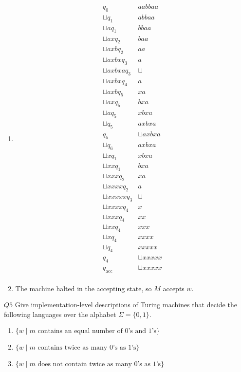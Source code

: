 \documentclass{article}
\theoremstyle{definition}
\theoremstyle{definition}
\theoremstyle{remark}
\begin{document}
\begin{enumerate}
    \item[$(iii)$]
    \begin{align*}
        q_0&aabbaa\\
        {\sqcup}q_1&abbaa\\
        {\sqcup}aq_1&bbaa\\
        {\sqcup}axq_2&baa\\
        {\sqcup}axbq_2&aa\\
        {\sqcup}axbxq_3&a\\
        {\sqcup}axbxaq_3&{\sqcup}\\
        {\sqcup}axbxq_4&a\\
        {\sqcup}axbq_5&xa\\
        {\sqcup}axq_5&bxa\\
        {\sqcup}aq_5&xbxa\\
        {\sqcup}q_5&axbxa\\
        q_5&{\sqcup}axbxa\\
        {\sqcup}q_6&axbxa\\
        {\sqcup}xq_1&xbxa\\
        {\sqcup}xxq_1&bxa\\
        {\sqcup}xxxq_2&xa\\
        {\sqcup}xxxxq_2&a\\
        {\sqcup}xxxxxq_3&{\sqcup}\\
        {\sqcup}xxxxq_4&x\\
        {\sqcup}xxxq_4&xx\\
        {\sqcup}xxq_4&xxx\\
        {\sqcup}xq_4&xxxx\\
        {\sqcup}q_4&xxxxx\\
        q_4&{\sqcup}xxxxx\\
        q_\text{acc}&{\sqcup}xxxxx\\
    \end{align*}

    \item[$(iv)$] The machine halted in the accepting state, so $M$ accepts $w$.
\end{enumerate}


\begin{questionbox}{$Q5$}
    Give implementation-level descriptions of Turing machines that decide the following languages over the alphabet $\Sigma=\{0,1\}$.
    \begin{enumerate}
        \item[$(i)$] $\{w\mid m\text{ contains an equal number of }0\text{'s and }1\text{'s}\}$
        \item[$(ii)$] $\{w\mid m\text{ contains twice as many }0\text{'s as }1\text{'s}\}$
        \item[$(iii)$] $\{w\mid m\text{ does not contain twice as many }0\text{'s as }1\text{'s}\}$
    \end{enumerate}
\end{questionbox}
\end{document}
